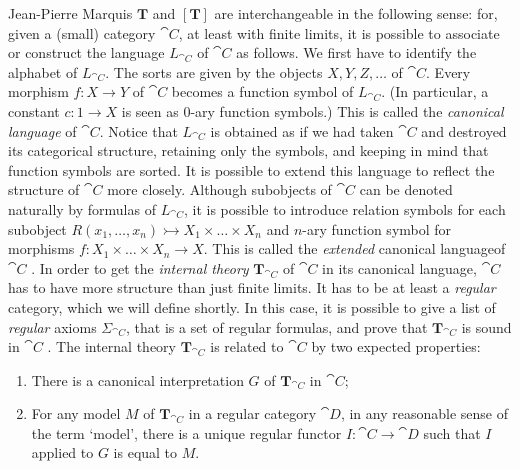 \begin{artengenv}{Jean-Pierre Marquis}
\( \mathbf{T} \) and \( [\mathbf{T}] \) are interchangeable in the following sense: for, given a (small) category \( \cat{C} \), at least with finite limits, it is possible to associate or construct the language \( L_{\cat{C}} \) of \( \cat{C} \) as follows. We first have to identify the alphabet of \( L_{\cat{C}} \). The sorts are given by the objects \( X, Y, Z, \dots \) of   \( \cat{C} \). Every morphism \( f\colon X \rightarrow Y \) of \( \cat{C} \) becomes a function symbol of \( L_{\cat{C}} \). (In particular, a constant \( c\colon 1 \rightarrow X \) is seen as \( 0 \)-ary function symbols.) This is called the \textit{canonical language} of \( \cat{C} \). Notice that \( L_{\cat{C}} \) is obtained as if we had taken \( \cat{C} \) and destroyed its categorical structure, retaining only the symbols, and keeping in mind that function symbols are sorted. It is possible to extend this language to reflect the structure of \( \cat{C} \) more closely. Although subobjects of \( \cat{C} \) can be denoted naturally by formulas of \( L_{\cat{C}} \), it is possible to introduce relation symbols for each subobject \( R(x_1, \dots, x_n) \rightarrowtail X_1 \times \dots \times X_n \) and \( n \)-ary function symbol for morphisms \( f\colon X_1 \times \dots \times X_n \rightarrow X \). This is called the \textit{extended} canonical languageof \( \cat{C} \) \parencite[see][chap.~2, sec.~4)]{MakkaiReyes1977}. In order to get the \textit{internal theory} \( \mathbf{T}_{\cat{C}} \) of \( \cat{C} \) in its canonical language, \( \cat{C}\) has to have more structure than just finite limits.  It has to be at least a \textit{regular} category, which we will define shortly. In this case, it is possible to give a list of \textit{regular} axioms \( \Sigma_{\cat{C}} \), that is a set of regular formulas, and prove that \( \mathbf{T}_{\cat{C}} \) is sound in \( \cat{C} \) \parencite[see][chap. 3]{MakkaiReyes1977}. The internal theory \( \mathbf{T}_{\cat{C}} \) is related to \( \cat{C} \) by two expected properties:
%
\begin{enumerate}
\item There is a canonical interpretation \( G \) of \( \mathbf{T}_{\cat{C}} \) in \( \cat{C} \);

\item For any model \( M \) of \( \mathbf{T}_{\cat{C}} \) in a regular category \( \cat{D} \), in any reasonable sense of the term `model', there is a unique regular functor \( I\colon \cat{C} \rightarrow \cat{D} \) such that \( I \) applied to \( G \) is equal to \( M \).
\end{enumerate}


\end{artengenv}
